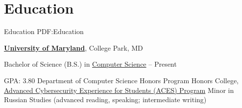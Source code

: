 
\section
{Education}
{Education}
{PDF:Education}

\href{https://umd.edu/}
{\textbf{University of Maryland}},
College Park, MD

\GapNoBreak
\BulletItem
Bachelor of Science (B.S.) in
\href{https://cs.umd.edu/}
{Computer Science}
\hfill
{} --
Present
\begin{detail}
\SubBulletItem
GPA: 3.80
\SubBulletItem
Department of Computer Science Honors Program
\SubBulletItem
Honors College, 
\href{https://aces.umd.edu/}
{Advanced Cybersecurity Experience for Students (ACES) Program}
\SubBulletItem
    Minor in Russian Studies (advanced reading, speaking; intermediate writing)
\end{detail}
